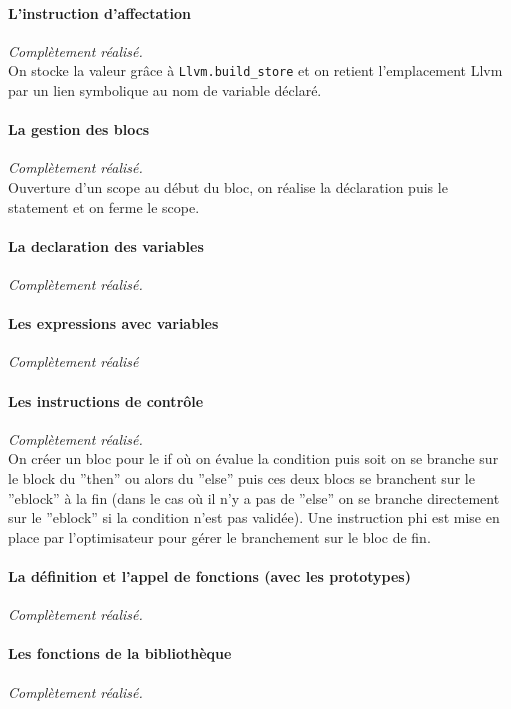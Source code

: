 \documentclass{article}
\begin{document}
\paragraph{L'instruction d'affectation}
\textit{Complètement réalisé.}\\
On stocke la valeur grâce à \texttt{Llvm.build\_store} et on retient
l'emplacement Llvm par un lien symbolique au nom de variable déclaré.

\paragraph{La gestion des blocs}
\textit{Complètement réalisé.}\\
Ouverture d'un scope au début du bloc, on réalise la déclaration puis le statement et on ferme le 
scope.

\paragraph{La declaration des variables}
\textit{Complètement réalisé.}

\paragraph{Les expressions avec variables}
\textit{Complètement réalisé}

\paragraph{Les instructions de contrôle }
\textit{Complètement réalisé.}\\
On créer un bloc pour le if où on évalue la condition puis soit on se branche sur le block du ''then'' 
ou alors du ''else'' puis ces deux blocs se branchent sur le ''eblock'' à la
fin (dans le cas où il n'y a pas de ''else'' on se branche directement sur le ''eblock'' si la condition n'est pas validée). Une instruction phi est mise en place par l'optimisateur pour gérer le
branchement sur le bloc de fin.

\paragraph{La définition et l'appel de fonctions (avec les prototypes)}
\textit{Complètement réalisé.}


\paragraph{Les fonctions de la bibliothèque}
\textit{Complètement réalisé.}
\end{document}
